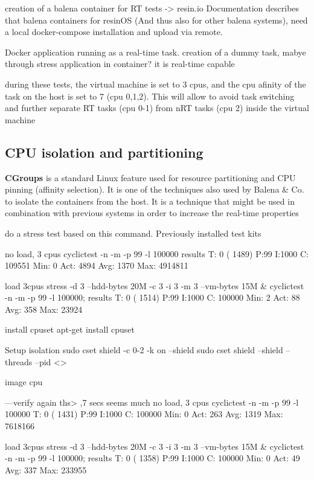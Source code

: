 \documentclass[]{scrartcl}
\begin{document}
creation of a balena container for RT tests
-> resin.io
Documentation describes that balena containers for resinOS (And thus also for other balena systems), need a local docker-compose installation and upload via remote.

Docker application running as a real-time task. creation of a dummy task, mabye through stress application in container? it is real-time capable

during these tests, the virtual machine is set to 3 cpus, and the cpu afinity of the task on the host is set to 7 (cpu 0,1,2). This will allow to avoid task switching and further separate RT tasks (cpu 0-1) from nRT tasks (cpu 2) inside the virtual machine

\subsection{CPU isolation and partitioning}

\textbf{CGroups} is a standard Linux feature used for resource partitioning and CPU pinning (affinity selection). It is one of the techniques also used by Balena \& Co. to isolate the containers from the host. It is a technique that might be used in combination with previous systems in order to increase the real-time properties


do a stress test based on this command. Previously installed test kits

no load, 3 cpus
cyclictest -n -m -p 99 -l 100000
results
T: 0 ( 1489) P:99 I:1000 C: 109551 Min:      0 Act: 4894 Avg: 1370 Max:  4914811

load 3cpus
stress -d 3 --hdd-bytes 20M -c 3 -i 3 -m 3 --vm-bytes 15M & cyclictest -n -m -p 99 -l 100000;
results
T: 0 ( 1514) P:99 I:1000 C: 100000 Min:      2 Act:   88 Avg:  358 Max:   23924


install cpuset
apt-get install cpuset


Setup isolation
sudo cset shield -c 0-2 -k on --shield
sudo cset shield --shield --threads --pid <>

image cpu


---verify again ths> ,7 secs seems much
no load, 3 cpus
cyclictest -n -m -p 99 -l 100000
T: 0 ( 1431) P:99 I:1000 C: 100000 Min:      0 Act:  263 Avg: 1319 Max:  7618166

load 3cpus
stress -d 3 --hdd-bytes 20M -c 3 -i 3 -m 3 --vm-bytes 15M & cyclictest -n -m -p 99 -l 100000;
results
T: 0 ( 1358) P:99 I:1000 C: 100000 Min:      0 Act:   49 Avg:  337 Max:   233955
\end{document}
